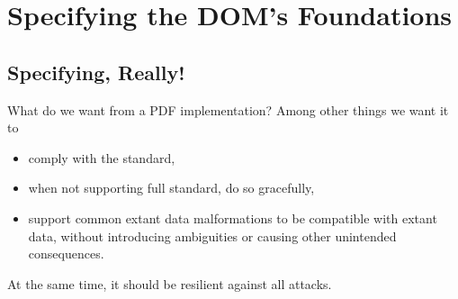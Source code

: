
\section{Specifying the DOM's Foundations }
\label{sec:specifying}

\subsection{Specifying, Really!}

What do we want from a PDF implementation?
Among other things we want it to
\begin{itemize}
\item comply with the standard,
\item when not supporting full standard, do so gracefully,
\item support common extant data malformations
  to be compatible with extant data, without introducing ambiguities
  or causing other unintended consequences.
\end{itemize}
At the same time, it should be resilient against all attacks.

